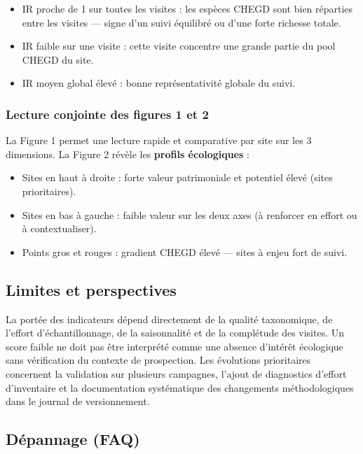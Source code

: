 \documentclass[11pt,a4paper]{article}
\begin{document}
\begin{itemize}
  \item IR proche de 1 sur toutes les visites : les espèces CHEGD sont bien réparties entre les visites — signe d'un suivi équilibré ou d'une forte richesse totale.
  \item IR faible sur une visite : cette visite concentre une grande partie du pool CHEGD du site.
  \item IR moyen global élevé : bonne représentativité globale du suivi.
\end{itemize}

\subsubsection{Lecture conjointe des figures 1 et 2}

La Figure 1 permet une lecture rapide et comparative par site sur les 3 dimensions.
La Figure 2 révèle les \textbf{profils écologiques} :
\begin{itemize}
  \item Sites en haut à droite : forte valeur patrimoniale et potentiel élevé (sites prioritaires).
  \item Sites en bas à gauche : faible valeur sur les deux axes (à renforcer en effort ou à contextualiser).
  \item Points gros et rouges : gradient CHEGD élevé — sites à enjeu fort de suivi.
\end{itemize}

\subsection{Limites et perspectives}
La portée des indicateurs dépend directement de la qualité taxonomique, de l'effort
d'échantillonnage, de la saisonnalité et de la complétude des visites. Un score faible ne doit
pas être interprété comme une absence d'intérêt écologique sans vérification du contexte de
prospection. Les évolutions prioritaires concernent la validation sur plusieurs campagnes,
l'ajout de diagnostics d'effort d'inventaire et la documentation systématique des changements
méthodologiques dans le journal de versionnement.

\subsection{Dépannage (FAQ)}
\end{document}
